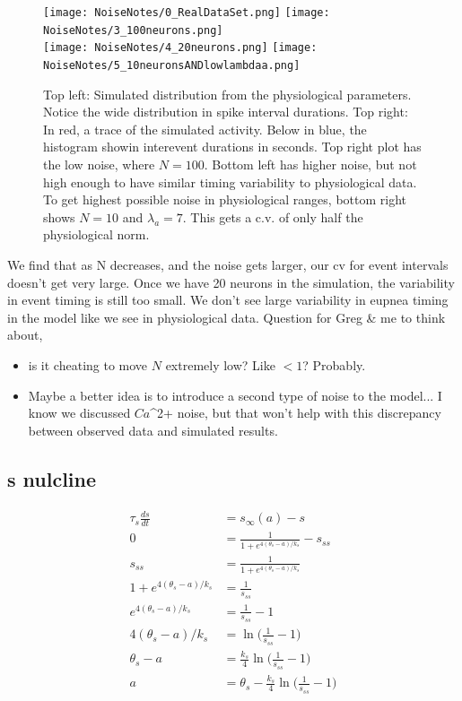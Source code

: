 \documentclass[12pt]{article}
\def\ca{Ca$^{2+}$\xspace}
\def\taus{\tau_s}
\def\thetas{\theta_s}
\def\ks{k_s}
\def\sinf{s_\infty}
\begin{document}
\begin{figure}[h!]
\texttt{[image: NoiseNotes/0\_RealDataSet.png]}
\texttt{[image: NoiseNotes/3\_100neurons.png]} \\
\texttt{[image: NoiseNotes/4\_20neurons.png]}
\texttt{[image: NoiseNotes/5\_10neuronsANDlowlambdaa.png]}
\caption{Top left: Simulated distribution from the physiological parameters. Notice the wide distribution in spike interval durations. Top right: In red, a trace of the simulated activity. Below in blue, the histogram showin interevent durations in seconds. Top right plot has the low noise, where $N=100$. Bottom left has higher noise, but not high enough to have similar timing variability to physiological data. To get highest possible noise in physiological ranges, bottom right shows $N=10$ and $\lambda_a=7$. This gets a c.v. of only half the physiological norm.}
\label{ChangingNoise}
\end{figure}

We find that as N decreases, and the noise gets larger, our cv for event intervals doesn't get very large. Once we have 20 neurons in the simulation, the variability in event timing is still too small. We don't see large variability in eupnea timing in the model like we see in physiological data. Question for Greg \& me to think about, 

\begin{itemize}
    \item is it cheating to move $N$ extremely low? Like $<1$?
    Probably.
    \item Maybe a better idea is to introduce a second type of noise to the model... I know we discussed $\ca$ noise, but that won't help with this discrepancy between observed data and simulated results.
\end{itemize} 

\subsection*{s nulcline}

\begin{align*}
    \taus \frac{ds}{dt} &= \sinf(a)-s \\
    0 &= \frac{1}{1+e^{4(\thetas-a)/\ks}} - s_{ss} \\
    s_{ss} &= \frac{1}{1+e^{4(\thetas-a)/\ks}}\\
    1+e^{4(\thetas-a)/\ks} &= \frac{1}{s_{ss}}\\
    e^{4(\thetas-a)/\ks} &= \frac{1}{s_{ss}}-1\\
    4(\thetas-a)/\ks &= \ln{\Big(\frac{1}{s_{ss}}-1\Big)}\\
    \thetas-a &= \frac{\ks}{4}\ln{\Big(\frac{1}{s_{ss}}-1\Big)}\\
    a &= \thetas - \frac{\ks}{4}\ln{\Big(\frac{1}{s_{ss}}-1\Big)}\\
\end{align*}
\end{document}
